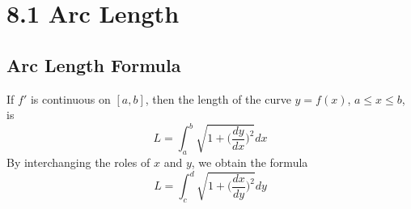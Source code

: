 %
%

\section*{8.1 Arc Length}

\subsection*{Arc Length Formula}

If \(f'\) is continuous on \([a, b]\), then the length of the curve \(y = f(x) \), \(a \leq x \leq b\), is
\[ L = \int_a^b{\sqrt{1 + \bigg( \frac{dy}{dx} \bigg) ^2} dx} \]
By interchanging the roles of \(x\) and \(y\), we obtain the formula 
\[ L = \int_c^d{\sqrt{1 + \bigg( \frac{dx}{dy} \bigg)^2} dy} \]

